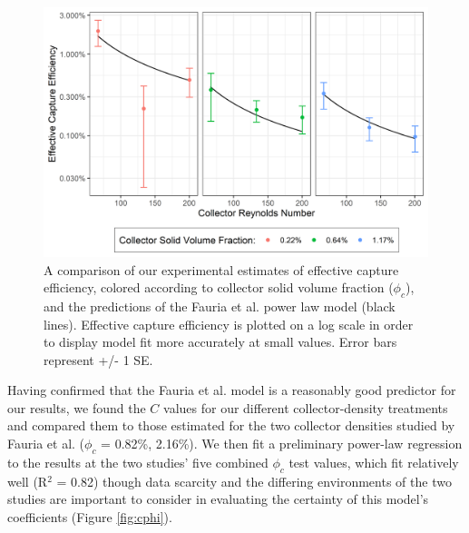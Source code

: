 \documentclass[geosciences,article,submit,moreauthors,pdftex]{Definitions/mdpi}
\begin{document}
\begin{figure}[h]
\centering
\includegraphics[width=5in]{../pics/comparisonplot.png}
\caption{A comparison of our experimental estimates of effective capture efficiency, colored according to collector solid volume fraction ($\phi_c$), and the predictions of the Fauria et al. \cite{Fauria_2015} power law model (black lines). Effective capture efficiency is plotted on a log scale in order to display model fit more accurately at small values. Error bars represent +/- 1 SE.}
\label{fig:compplot}
\end{figure}   

Having confirmed that the Fauria et al. \cite{Fauria_2015} model is a reasonably good predictor for our results, we found the $C$ values for our different collector-density treatments and compared them to those estimated for the two collector densities studied by Fauria et al. ($\phi_c$ = 0.82\%, 2.16\%). We then fit a preliminary power-law regression to the results at the two studies' five combined $\phi_c$ test values, which fit relatively well (R$^2$ = 0.82) though data scarcity and the differing environments of the two studies are important to consider in evaluating the certainty of this model's coefficients (Figure \ref{fig:cphi}).
\end{document}
